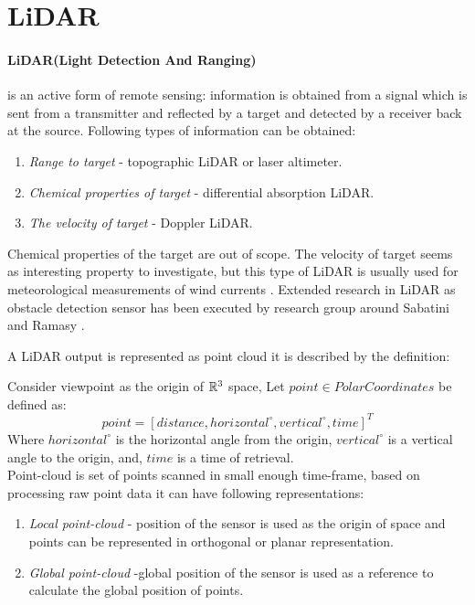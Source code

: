 \newpage
\section{LiDAR}\label{sec:LiDARStateOfArt}
\noindent \paragraph{LiDAR(Light Detection And Ranging)} is an active form of remote sensing: information is obtained from a signal which is sent from a transmitter and reflected by a target and detected by a receiver back at the source. Following types of information can be obtained:
\begin{enumerate}
\item \textit{Range to target} - topographic LiDAR or laser altimeter.
\item \textit{Chemical properties of target} - differential absorption LiDAR.
\item \textit{The velocity of target} - Doppler LiDAR.
\end{enumerate}

\noindent Chemical properties of the target are out of scope. The velocity of  target seems as interesting property to investigate, but this type of LiDAR is usually used for meteorological measurements of wind currents \cite{martin2011meteorological}. Extended research in LiDAR as obstacle detection sensor has been executed by research group around Sabatini \cite{sabatini2014lidar} and Ramasy \cite{ramasamy2016lidar}. 

A LiDAR output is represented as point cloud it is described by the definition:

\begin{definition}
Consider viewpoint as the origin of $\mathbb{R}^3$ space,  Let  $point \in Polar Coordinates$ be defined as:
    \begin{equation}
        point = [ distance, horizontal^\circ, vertical^\circ, time ]^T
    \end{equation}
    Where $horizontal^\circ$ is the horizontal angle from the origin, $vertical^\circ$ is a vertical angle to the origin, and, $time$ is a time of retrieval.\\

    \noindent Point-cloud is set of points scanned in small enough time-frame, based on processing raw point data it can have following representations:
    
    \begin{enumerate}
        \item \emph{Local point-cloud} - position of the sensor is used as the origin of space and points can be represented in orthogonal or planar representation. 
        
        \item \emph{Global point-cloud} -global position of the sensor is used as a reference to calculate the global position of points.
    \end{enumerate}
\end{definition}

